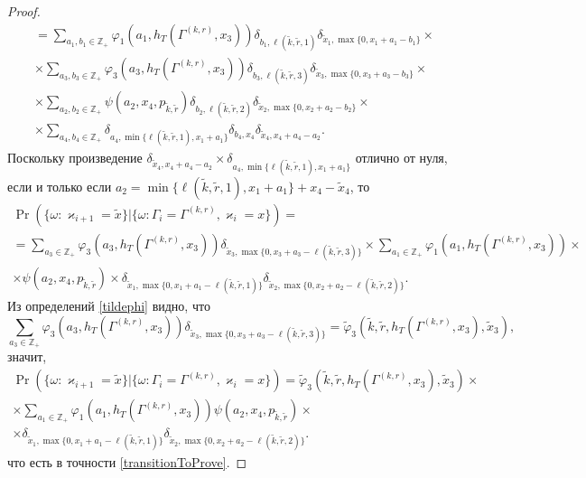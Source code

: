 \begin{proof}
\begin{multline*}
=\sum_{a_1,  b_1 \in \mathbb{Z}_+} \varphi_1(a_1,  h_T(\Gamma^{(k,  r)},  x_3)) \delta_{b_1,  \ell(\tilde{k},  \tilde{r},  1)} \delta_{\tilde{x}_1,  \max{\{0,  x_1+a_1-b_1\}}} \times \\
\times \sum_{a_3,  b_3 \in \mathbb{Z}_+}  \varphi_3(a_3,  h_T(\Gamma^{(k,  r)},  x_3)) \delta_{b_3,  \ell(\tilde{k},  \tilde{r},  3)}  \delta_{\tilde{x}_3,  \max{\{0,  x_3+a_3-b_3\}}} \times \\
\times \sum_{a_2,  b_2 \in \mathbb{Z}_+}  \psi(a_2,  x_4,   p_{\tilde{k},  \tilde{r}})   \delta_{b_2,  \ell(\tilde{k},  \tilde{r},  2)}   \delta_{\tilde{x}_2,  \max{\{0,  x_2+a_2-b_2\}}} \times \\
\times \sum_{a_4,  b_4 \in \mathbb{Z}_+}  \delta_{a_4,  \min{\{\ell(\tilde{k},  \tilde{r},  1),   x_1+a_1}\}}   \delta_{b_4,  x_4} \delta_{\tilde{x}_4,  x_4+a_4-a_2}.
\end{multline*}
Поскольку произведение $\delta_{\tilde{x}_4,  x_4+a_4-a_2}\times \delta_{a_4,  \min{\{\ell(\tilde{k},  \tilde{r},  1),   x_1+a_1}\}}$ отлично от нуля,   если и только если $a_2 = \min{\{\ell(\tilde{k},  \tilde{r},  1),   x_1+a_1}\} +x_4-\tilde{x}_4$,   то
\begin{multline*}
\Pr (\{\omega\colon\varkappa_{i+1}=\tilde{x}\}|\{\omega\colon\Gamma_{i}=\Gamma^{(k,  r)},  \varkappa_i=x\})=\\=\sum_{a_3\in \mathbb{Z}_+}  \varphi_3(a_3,  h_T(\Gamma^{(k,  r)},  x_3))  \delta_{\tilde{x}_3,  \max{\{0,  x_3+a_3-\ell(\tilde{k},  \tilde{r},  3)\}}} 
\times\sum_{a_1 \in \mathbb{Z}_+} \varphi_1(a_1,  h_T(\Gamma^{(k,  r)},  x_3))  \times \\ \times \psi(a_2,  x_4,   p_{\tilde{k},  \tilde{r}}) 
\times \delta_{\tilde{x}_1,  \max{\{0,  x_1+a_1-\ell(\tilde{k},  \tilde{r},  1)\}}}  \delta_{\tilde{x}_2,  \max{\{0,  x_2+a_2-\ell(\tilde{k}, \tilde{r}, 2)\}}}.
\end{multline*}
Из определений \eqref{tildephi} видно,  что
\begin{equation*}
\sum_{a_3\in \mathbb{Z}_+}  \varphi_3(a_3, h_T(\Gamma^{(k, r)}, x_3))  \delta_{\tilde{x}_3, \max{\{0, x_3+a_3-\ell(\tilde{k}, \tilde{r}, 3)\}}} = \tilde{\varphi}_3(\tilde{k}, \tilde{r}, h_T(\Gamma^{(k, r)}, x_3), \tilde{x}_3), 
\end{equation*}
значит, 
\begin{multline*}
\Pr (\{\omega\colon\varkappa_{i+1}=\tilde{x}\}|\{\omega\colon\Gamma_{i}=\Gamma^{(k, r)}, \varkappa_i=x\})
=\tilde{\varphi}_3(\tilde{k}, \tilde{r}, h_T(\Gamma^{(k, r)}, x_3), \tilde{x}_3) \times\\
\times \sum_{a_1 \in \mathbb{Z}_+} \varphi_1(a_1, h_T(\Gamma^{(k, r)}, x_3))  \psi(a_2, x_4,  p_{\tilde{k}, \tilde{r}}) \times \\ \times \delta_{\tilde{x}_1, \max{\{0, x_1+a_1-\ell(\tilde{k}, \tilde{r}, 1)\}}}  \delta_{\tilde{x}_2, \max{\{0, x_2+a_2-\ell(\tilde{k}, \tilde{r}, 2)\}}}.
\end{multline*}
что есть в точности \eqref{transitionToProve}.
\end{proof}
